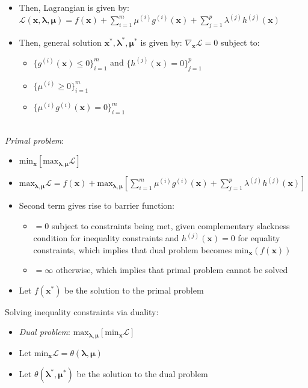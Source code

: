 \begin{itemize}
    \item Then, Lagrangian is given by: $\mathcal{L}(\boldsymbol{x},\boldsymbol{\lambda},\boldsymbol{\mu}) = f(\boldsymbol{x}) + \sum_{i=1}^m \mu^{(i)} g^{(i)}(\boldsymbol{x}) + \sum_{j=1}^p \lambda^{(j)} h^{(j)}(\boldsymbol{x})$
    \item Then, general solution $\boldsymbol{x^*},\boldsymbol{\lambda^*},\boldsymbol{\mu^*}$ is given by: $\nabla_{\boldsymbol{x}} \mathcal{L} = 0$ subject to:
    \begin{itemize}
        \item $\{g^{(i)}(\boldsymbol{x}) \leq 0\}_{i=1}^m$ and $\{h^{(j)}(\boldsymbol{x}) = 0\}_{j=1}^p$ 
        \item $\{\mu^{(i)} \geq 0\}_{i=1}^m$
        \item $\{\mu^{(i)}g^{(i)}(\boldsymbol{x}) = 0\}_{i=1}^m$
    \end{itemize}
\end{itemize}\\
\emph{Primal problem}:
\begin{itemize}
    \item $\textrm{min}_{\boldsymbol{x}} [\textrm{max}_{\boldsymbol{\lambda},\boldsymbol{\mu}} \mathcal{L}]$
    \item $\textrm{max}_{\boldsymbol{\lambda},\boldsymbol{\mu}} \mathcal{L} = f(\boldsymbol{x}) + \textrm{max}_{\boldsymbol{\lambda},\boldsymbol{\mu}} [\sum_{i=1}^m \mu^{(i)} g^{(i)}(\boldsymbol{x}) + \sum_{j=1}^p \lambda^{(j)} h^{(j)}(\boldsymbol{x})]$
    \item Second term gives rise to barrier function:
    \begin{itemize}
        \item $= 0$ subject to constraints being met, given complementary slackness condition for inequality constraints and $h^{(j)}(\boldsymbol{x}) = 0$ for equality constraints, which implies that dual problem becomes $\textrm{min}_{\boldsymbol{x}}(f(\boldsymbol{x}))$
        \item $= \infty$ otherwise, which implies that primal problem cannot be solved
    \end{itemize}
    \item Let $f(\boldsymbol{x}^*)$ be the solution to the primal problem
\end{itemize}
Solving inequality constraints via duality: 
\begin{itemize}
    \item \emph{Dual problem}: $ \textrm{max}_{\boldsymbol{\lambda},\boldsymbol{\mu}} [\textrm{min}_{\boldsymbol{x}} \mathcal{L}]$
    \item Let $\textrm{min}_{\boldsymbol{x}} \mathcal{L} = \theta(\boldsymbol{\lambda},\boldsymbol{\mu})$
    \item Let $\theta(\boldsymbol{\lambda}^*,\boldsymbol{\mu}^*)$ be the solution to the dual problem
\end{itemize}
